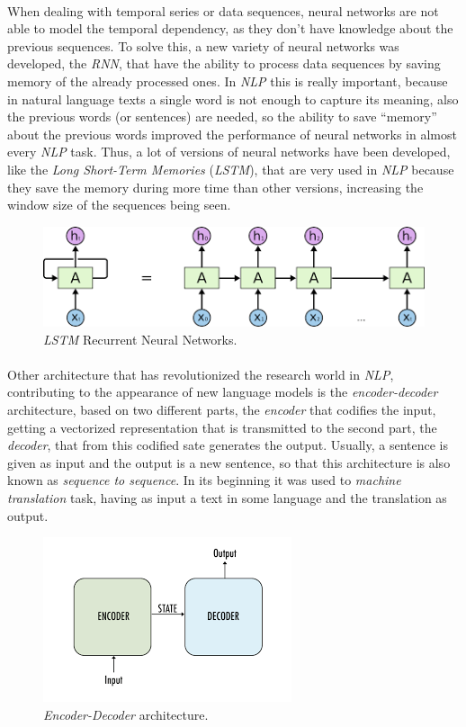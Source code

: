\paragraph{}
When dealing with temporal series or data sequences, neural networks are not able to model the temporal dependency, as they don't have knowledge about the previous sequences. To solve this, a new variety of neural networks was developed, the \emph{RNN}, that have the ability to process data sequences by saving memory of the already processed ones. In \emph{NLP} this is really important, because in natural language texts a single word is not enough to capture its meaning, also the previous words (or sentences) are needed, so the ability to save ``memory'' about the previous words improved the performance of neural networks in almost every \emph{NLP} task. Thus, a lot of versions of neural networks have been developed, like the \emph{Long Short-Term Memories} (\emph{LSTM}), that are very used in \emph{NLP} because they save the memory during more time than other versions, increasing the window size of the sequences being seen.
\begin{figure}[!h]
	\centering
	\includegraphics[scale=0.55]{images/lstm}
	\caption{\emph{LSTM} Recurrent Neural Networks.}
	\label{fig:lstm}
\end{figure}
\paragraph{}
Other architecture that has revolutionized the research world in \emph{NLP}, contributing to the appearance of new language models is the \emph{encoder-decoder} architecture, based on two different parts, the \emph{encoder} that codifies the input, getting a vectorized representation that is transmitted to the second part, the \emph{decoder}, that from this codified sate generates the output. Usually, a sentence is given as input and the output is a new sentence, so that this architecture is also known as \emph{sequence to sequence}. In its beginning it was used to \emph{machine translation} task, having as input a text in some language and the translation as output.
\begin{figure}[h!]
	\centering
	\includegraphics[scale=0.75]{images/encoderdecoder}
	\caption{\emph{Encoder-Decoder} architecture.}
	\label{fig:encoderdecoder}
\end{figure}
